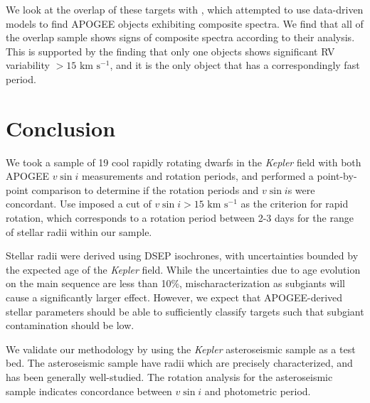 \documentclass[manuscript]{aastex6}
\newcommand{\vsini}{\ensuremath{v \sin i}}
\newcommand{\Kepler}{\mbox{\textit{Kepler}}}
\newcommand{\kms}{\textrm{ km~s}\ensuremath{^{-1}}}
\newcommand{\gvs}{\authorcomment1}
\begin{document}
We look at the overlap of these targets with \citep{ElBadry18}, which attempted
to use data-driven models to find APOGEE objects exhibiting composite spectra. We 
find that all of the overlap sample shows signs of composite spectra according
to their analysis. This is supported by the finding that only one 
objects shows significant RV variability \(> 15 \kms\), and it is \gvs{one of} 
the only object that has a correspondingly fast period.




\section{Conclusion}
\label{sec:conclusions}

We took a sample of 19 cool rapidly rotating dwarfs in the \Kepler{} field with 
both APOGEE \vsini{} measurements and \citet{McQuillan14} rotation periods, and 
performed a point-by-point comparison to determine if the rotation periods and
\vsini{}s were concordant. Use imposed a cut of \(\vsini > 15 \kms\) as the
criterion for rapid rotation, which corresponds to a rotation period between
2-3 days for the range of stellar radii within our sample.

Stellar radii were derived using DSEP isochrones, with uncertainties bounded by
the expected age of the \Kepler{} field. While the uncertainties due to age
evolution on the main sequence are less than 10\%, mischaracterization as
subgiants will cause a significantly larger effect. However, we expect that
APOGEE-derived stellar parameters should be able to sufficiently classify
targets such that subgiant contamination should be low.

We validate our methodology by using the \Kepler{} asteroseismic sample as a
test bed. The asteroseismic sample have radii which are precisely
characterized, and has been generally well-studied. The rotation analysis for
the asteroseismic sample indicates concordance between \vsini{} and photometric
period.
\end{document}
